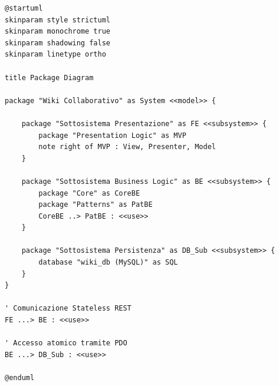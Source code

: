 \begin{verbatim}
@startuml
skinparam style strictuml
skinparam monochrome true
skinparam shadowing false
skinparam linetype ortho

title Package Diagram

package "Wiki Collaborativo" as System <<model>> {

    package "Sottosistema Presentazione" as FE <<subsystem>> {
        package "Presentation Logic" as MVP
        note right of MVP : View, Presenter, Model
    }

    package "Sottosistema Business Logic" as BE <<subsystem>> {
        package "Core" as CoreBE
        package "Patterns" as PatBE
        CoreBE ..> PatBE : <<use>>
    }

    package "Sottosistema Persistenza" as DB_Sub <<subsystem>> {
        database "wiki_db (MySQL)" as SQL
    }
}

' Comunicazione Stateless REST
FE ...> BE : <<use>>

' Accesso atomico tramite PDO
BE ...> DB_Sub : <<use>>

@enduml
\end{verbatim}